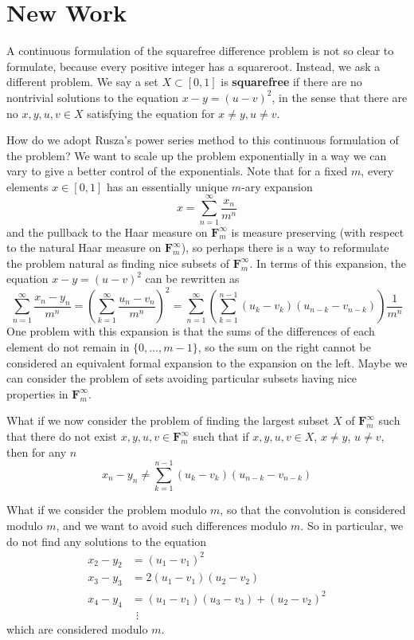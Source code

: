 \documentclass{article}
\theoremstyle{plain}
\theoremstyle{plain}
\begin{document}
\part{New Work}

A continuous formulation of the squarefree difference problem is not so clear to formulate, because every positive integer has a squareroot. Instead, we ask a different problem. We say a set $X \subset [0,1]$ is {\bf squarefree} if there are no nontrivial solutions to the equation $x - y = (u - v)^2$, in the sense that there are no $x,y,u,v \in X$ satisfying the equation for $x \neq y, u \neq v$.

How do we adopt Rusza's power series method to this continuous formulation of the problem? We want to scale up the problem exponentially in a way we can vary to give a better control of the exponentials. Note that for a fixed $m$, every elements $x \in [0,1]$ has an essentially unique $m$-ary expansion
%
\[ x = \sum_{n = 1}^\infty \frac{x_n}{m^n} \]
%
and the pullback to the Haar measure on $\mathbf{F}_m^\infty$ is measure preserving (with respect to the natural Haar measure on $\mathbf{F}_m^\infty$), so perhaps there is a way to reformulate the problem natural as finding nice subsets of $\mathbf{F}_m^\infty$. In terms of this expansion, the equation $x - y = (u - v)^2$ can be rewritten as
%
\[ \sum_{n = 1}^\infty \frac{x_n - y_n}{m^n} = \left( \sum_{k = 1}^\infty \frac{u_n - v_n}{m^n} \right)^2 = \sum_{n = 1}^\infty \left( \sum_{k = 1}^{n-1} (u_k - v_k)(u_{n-k} - v_{n-k}) \right) \frac{1}{m^n} \]
%
One problem with this expansion is that the sums of the differences of each element do not remain in $\{ 0, \dots, m-1 \}$, so the sum on the right cannot be considered an equivalent formal expansion to the expansion on the left. Maybe we can consider the problem of sets avoiding particular subsets having nice properties in $\mathbf{F}_m^\infty$.

What if we now consider the problem of finding the largest subset $X$ of $\mathbf{F}_m^\infty$ such that there do not exist $x,y,u,v \in \mathbf{F}_m^\infty$ such that if $x,y,u,v \in X$, $x \neq y$, $u \neq v$, then for any $n$
%
\[ x_n - y_n \neq \sum_{k = 1}^{n-1} (u_k - v_k)(u_{n-k} - v_{n-k}) \]

What if we consider the problem modulo $m$, so that the convolution is considered modulo $m$, and we want to avoid such differences modulo $m$. So in particular, we do not find any solutions to the equation
%
\begin{align*}
    x_2 - y_2 &= (u_1 - v_1)^2\\
    x_3 - y_3 &= 2 (u_1 - v_1)(u_2 - v_2)\\
    x_4 - y_4 &= (u_1 - v_1)(u_3 - v_3) + (u_2 - v_2)^2\\
    &\ \ \vdots
\end{align*}
%
which are considered modulo $m$.
\end{document}
